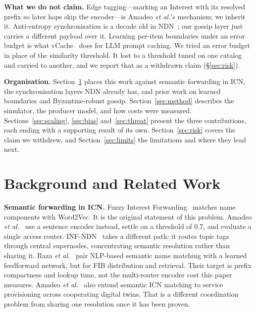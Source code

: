\documentclass[conference]{IEEEtran}
\begin{document}
		\textbf{What we do not claim.} Edge tagging---marking an Interest with its
		resolved prefix so later hops skip the encoder---is Amadeo \emph{et al.}'s
		mechanism; we inherit it. Anti-entropy synchronisation is a decade old in
		NDN~\cite{zhu2013chronosync,hoque2013nlsr}; our gossip layer just carries a
		different payload over it. Learning per-item boundaries under an error
		budget is what vCache~\cite{schroeder2025vcache} does for LLM prompt caching.
		We tried an error budget in place of the similarity threshold. It lost to a
		threshold tuned on one catalog and carried to another, and we report that as
		a withdrawn claim (\S\ref{sec:risk}).
		
		\textbf{Organisation.} Section~\ref{sec:related} places this work against
		semantic forwarding in ICN, the synchronisation layers NDN already has, and
		prior work on learned boundaries and Byzantine-robust gossip.
		Section~\ref{sec:method} describes the simulator, the producer model, and how
		costs were measured. Sections~\ref{sec:scaling}, \ref{sec:bias}
		and~\ref{sec:threat} present the three contributions, each ending with a
		supporting result of its own. Section~\ref{sec:risk} covers the claim we
		withdrew, and Section~\ref{sec:limits} the limitations and where they lead
		next.
		
		\section{Background and Related Work}
		\label{sec:related}
		
		\textbf{Semantic forwarding in ICN.} Fuzzy Interest
		Forwarding~\cite{chan2017fuzzy} matches name components with Word2Vec. It is
		the original statement of this problem. Amadeo \emph{et
			al.}~\cite{amadeo2026} use a sentence encoder instead, settle on a threshold
		of $0.7$, and evaluate a single access router. INF-NDN~\cite{raza2024infndn}
		takes a different path: it routes topic tags through central supernodes,
		concentrating semantic resolution rather than sharing it. Raza \emph{et
			al.}~\cite{raza2025smartnets} pair NLP-based semantic name matching with a
		learned feedforward network, but for FIB distribution and retrieval. Their
		target is prefix compactness and lookup time, not the multi-router encoder
		cost this paper measures. Amadeo \emph{et al.}~\cite{amadeo2026dtn} also
		extend semantic ICN matching to service provisioning across cooperating
		digital twins. That is a different coordination problem from sharing one
		resolution once it has been proven.
		
\end{document}
